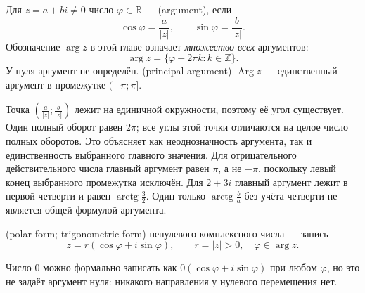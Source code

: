 \begin{definition}
Для \(z=a+bi\ne0\) число \(\varphi\in\mathbb R\) —  (argument), если
\[
\cos\varphi=\frac a{|z|},\qquad \sin\varphi=\frac b{|z|}.
\]
Обозначение \(\arg z\) в этой главе означает \emph{множество всех} аргументов:
\[
\arg z=\{\varphi+2\pi k:k\in\mathbb Z\}.
\]
У нуля аргумент не определён.  (principal argument) \(\operatorname{Arg}z\) — единственный аргумент в промежутке \((-\pi;\pi]\).
\end{definition}
Точка \((\frac a{|z|};\frac b{|z|})\) лежит на единичной окружности, поэтому её угол существует. Один полный оборот равен \(2\pi\); все углы этой точки отличаются на целое число полных оборотов. Это объясняет как неоднозначность аргумента, так и единственность выбранного главного значения. Для отрицательного действительного числа главный аргумент равен \(\pi\), а не \(-\pi\), поскольку левый конец выбранного промежутка исключён. Для \(2+3i\) главный аргумент лежит в первой четверти и равен \(\operatorname{arctg}\frac32\). Один только \(\operatorname{arctg}\frac ba\) без учёта четверти не является общей формулой аргумента.

\begin{definition}
 (polar form; trigonometric form) ненулевого комплексного числа — запись
\[
z=r(\cos\varphi+i\sin\varphi),\qquad r=|z|>0,\quad\varphi\in\arg z.
\]
\end{definition}
Число \(0\) можно формально записать как \(0(\cos\varphi+i\sin\varphi)\) при любом \(\varphi\), но это не задаёт аргумент нуля: никакого направления у нулевого перемещения нет.

